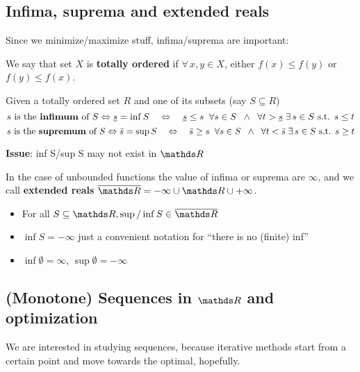 \documentclass[computational_mathematics.tex]{subfiles}
\begin{document}
\subsection{Infima, suprema and extended reals}
\noindent Since we minimize/maximize stuff, infima/suprema are important:
\begin{definition}
  We say that  set $X$ is \textbf{totally ordered} if $\forall \, x, y \in X$, either $f(x) \leq f(y)$ or $f(y) \leq f(x)$.
\end{definition}

\begin{definition}
  Given a totally ordered set $R$ and one of its subsets (say $S \subseteq R$)
\[
  s\text{ is the {\bf infimum} of } S \Leftrightarrow \underline{s} = \inf S
  \quad\Leftrightarrow\quad
  \underline{s} \leq s \;\; \forall s \in S
  \;\;\wedge\;\;
  \forall t > \underline{s} \; \exists \, s \in S \mbox{ s.t. } s \leq t
\]
\[
  s \text{ is the {\bf supremum} of } S \Leftrightarrow \bar{s} = \sup S
  \quad\Leftrightarrow\quad
  \bar{s} \geq s \;\; \forall s \in S
  \;\;\wedge\;\;
  \forall t < \bar{s} \; \exists \, s \in S \mbox{ s.t. } s \geq t
\]
\end{definition}

\noindent \textbf{Issue}: inf S/sup S may not exist in $\R$

\begin{definition}
  In the case of unbounded functions the value of infima or suprema are $\infty$, and we call \textbf{extended reals} $\overline{\R} = {-\infty} \cup \R \cup {+\infty}$.
\end{definition}

\begin{itemize}
    \item For all $S \subseteq \R, \sup / \inf S \in \overline{\R}$
    \item $\inf S = -\infty $ just a convenient notation for “there is no (finite) inf”
    \item $\inf \emptyset = \infty$, $\sup \emptyset = -\infty$
\end{itemize}

\subsection{(Monotone) Sequences in $\R$ and optimization}
\noindent We are interested in studying sequences, because iterative methods start from a certain point and move towards the optimal, hopefully.\\
\end{document}
